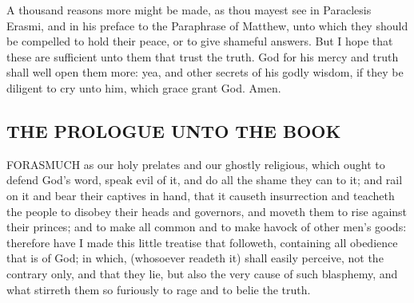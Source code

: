 A thousand reasons more might be made, as 
thou mayest see in Paraclesis Erasmi, and in his 
preface to the Paraphrase of Matthew, unto 
which they should be compelled to hold their 
peace, or to give shameful answers. But I hope 
that these are sufficient unto them that trust the 
truth. God for his mercy and truth shall well open 
them more: yea, and other secrets of his godly 
wisdom, if they be diligent to cry unto him, 
which grace grant God. Amen. 


\subsection*{THE PROLOGUE UNTO THE BOOK}

FORASMUCH as our holy prelates and our ghostly religious,
which ought to defend God's word, speak evil 
of it, and do all the shame they can to it; and rail on it and 
bear their captives in hand, that it causeth insurrection and 
teacheth the people to disobey their heads and governors, 
and moveth them to rise against their princes; and to make 
all common and to make havock of other men's goods:
therefore have I made this little treatise that followeth, containing
all obedience that is of God; in which, (whosoever 
readeth it) shall easily perceive, not the contrary only, and 
that they lie, but also the very cause of such blasphemy, 
and what stirreth them so furiously to rage and to belie the 
truth. 

